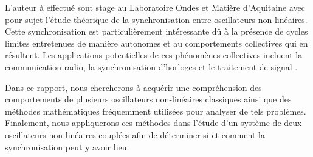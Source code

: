 L'auteur à effectué sont stage au Laboratoire Ondes et Matière d'Aquitaine avec pour
sujet {l'étude théorique de la synchronisation entre oscillateurs non-linéaires}.
Cette synchronisation est particulièrement intéressante dû
à la présence de cycles limites entretenues de manière autonomes et au comportements collectives
qui en résultent. Les applications potentielles de ces phénomènes collectives
incluent la communication radio, la synchronisation d'horloges et le traitement de signal \cite{djorwe_self-organized_2020}.

Dans ce rapport, nous chercherons à acquérir une compréhension des 
comportements de plusieurs oscillateurs non-linéaires classiques ainsi que 
des méthodes mathématiques fréquemment utilisées pour analyser de tels problèmes. 
Finalement, nous appliquerons ces méthodes dans l'étude d'un système 
de deux oscillateurs non-linéaires couplées afin de déterminer si et comment la synchronisation
peut y avoir lieu.



